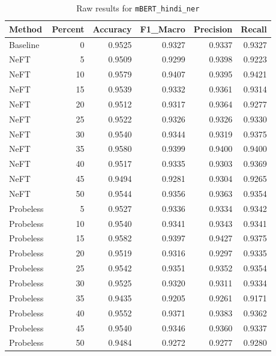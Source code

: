 \documentclass[12pt]{article}
\begin{document}
\begin{table}[H]
\centering
\caption{Raw results for \texttt{mBERT\_hindi\_ner}}
\label{tab:mbert-hindi-ner}
\begin{tabular}{lrrrrr}
\toprule
Method & Percent & Accuracy & F1\_Macro & Precision & Recall \\
\midrule
Baseline & 0 & 0.9525 & 0.9327 & 0.9337 & 0.9327 \\
NeFT & 5 & 0.9509 & 0.9299 & 0.9398 & 0.9223 \\
NeFT & 10 & 0.9579 & 0.9407 & 0.9395 & 0.9421 \\
NeFT & 15 & 0.9539 & 0.9332 & 0.9361 & 0.9314 \\
NeFT & 20 & 0.9512 & 0.9317 & 0.9364 & 0.9277 \\
NeFT & 25 & 0.9522 & 0.9326 & 0.9326 & 0.9330 \\
NeFT & 30 & 0.9540 & 0.9344 & 0.9319 & 0.9375 \\
NeFT & 35 & 0.9580 & 0.9399 & 0.9400 & 0.9400 \\
NeFT & 40 & 0.9517 & 0.9335 & 0.9303 & 0.9369 \\
NeFT & 45 & 0.9494 & 0.9281 & 0.9304 & 0.9265 \\
NeFT & 50 & 0.9544 & 0.9356 & 0.9363 & 0.9354 \\
Probeless & 5 & 0.9527 & 0.9336 & 0.9334 & 0.9342 \\
Probeless & 10 & 0.9540 & 0.9341 & 0.9343 & 0.9341 \\
Probeless & 15 & 0.9582 & 0.9397 & 0.9427 & 0.9375 \\
Probeless & 20 & 0.9519 & 0.9316 & 0.9297 & 0.9335 \\
Probeless & 25 & 0.9542 & 0.9351 & 0.9352 & 0.9354 \\
Probeless & 30 & 0.9525 & 0.9320 & 0.9311 & 0.9334 \\
Probeless & 35 & 0.9435 & 0.9205 & 0.9261 & 0.9171 \\
Probeless & 40 & 0.9552 & 0.9371 & 0.9383 & 0.9362 \\
Probeless & 45 & 0.9540 & 0.9346 & 0.9360 & 0.9337 \\
Probeless & 50 & 0.9484 & 0.9272 & 0.9277 & 0.9280 \\
\bottomrule
\end{tabular}
\end{table}
\end{document}
